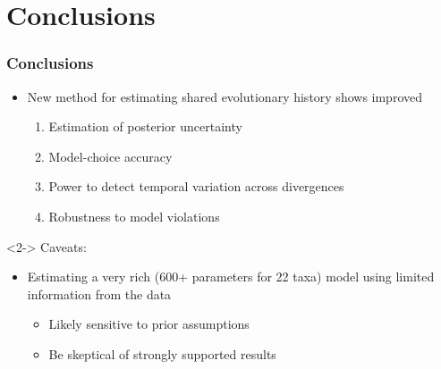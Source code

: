 \section{Conclusions}

\begin{frame}
    \frametitle{Conclusions}
    \begin{itemize}
        \item<1-> New method for estimating shared evolutionary history shows
            improved
        \begin{enumerate}
            \item Estimation of posterior uncertainty
            \item Model-choice accuracy
            \item Power to detect temporal variation across divergences
            \item Robustness to model violations
        \end{enumerate}

    \end{itemize}

    \begin{uncoverenv}<2->
    \bigskip
    Caveats:\\
    \begin{itemize}
            \item<1-> Estimating a very rich (600+ parameters for 22 taxa) model
                using limited information from the data
    
            \begin{itemize}
                \item Likely sensitive to prior assumptions
                \item Be skeptical of strongly supported results
            \end{itemize}
    
        \end{itemize}
    \end{uncoverenv}
\end{frame}

